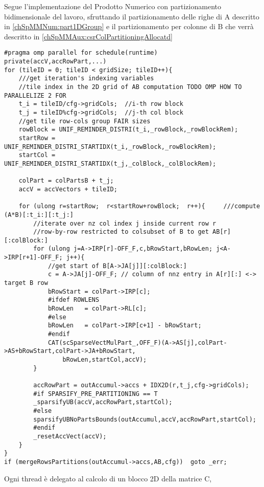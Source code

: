 \clearpage
Segue l'implementazione del Prodotto Numerico con partizionamento bidimensionale del lavoro,
sfruttando il partizionamento delle righe di A descritto in \ref{chSpMMNum:part1DGroup}
e il partizionamento per colonne di B che verrà descritto in \ref{chSpMMAux:csrColPartitioningAllocatd}
\begin{lstlisting}
#pragma omp parallel for schedule(runtime) private(accV,accRowPart,...)
for (tileID = 0; tileID < gridSize; tileID++){
    ///get iteration's indexing variables
    //tile index in the 2D grid of AB computation TODO OMP HOW TO PARALLELIZE 2 FOR
    t_i = tileID/cfg->gridCols;  //i-th row block
    t_j = tileID%cfg->gridCols;  //j-th col block
    //get tile row-cols group FAIR sizes
    rowBlock = UNIF_REMINDER_DISTRI(t_i,_rowBlock,_rowBlockRem); 
    startRow = UNIF_REMINDER_DISTRI_STARTIDX(t_i,_rowBlock,_rowBlockRem);
    startCol = UNIF_REMINDER_DISTRI_STARTIDX(t_j,_colBlock,_colBlockRem);
    
    colPart = colPartsB + t_j;
    accV = accVectors + tileID; 
     
    for (ulong r=startRow;  r<startRow+rowBlock;  r++){		///compute (A*B)[:t_i:][:t_j:]
        //iterate over nz col index j inside current row r
        //row-by-row restricted to colsubset of B to get AB[r][:colBlock:]
        for (ulong j=A->IRP[r]-OFF_F,c,bRowStart,bRowLen; j<A->IRP[r+1]-OFF_F; j++){
            //get start of B[A->JA[j]][:colBlock:]
            c = A->JA[j]-OFF_F; // column of nnz entry in A[r][:] <-> target B row
            bRowStart = colPart->IRP[c];
            #ifdef ROWLENS
            bRowLen   = colPart->RL[c];
            #else
            bRowLen   = colPart->IRP[c+1] - bRowStart;
            #endif
            CAT(scSparseVectMulPart_,OFF_F)(A->AS[j],colPart->AS+bRowStart,colPart->JA+bRowStart,
                bRowLen,startCol,accV);
        }

        accRowPart = outAccumul->accs + IDX2D(r,t_j,cfg->gridCols);
        #if SPARSIFY_PRE_PARTITIONING == T
        _sparsifyUB(accV,accRowPart,startCol);
        #else
        sparsifyUBNoPartsBounds(outAccumul,accV,accRowPart,startCol);
        #endif
        _resetAccVect(accV);
    }
}
if (mergeRowsPartitions(outAccumul->accs,AB,cfg))  goto _err;
\end{lstlisting}
Ogni thread è delegato al calcolo di un blocco 2D della matrice C,
